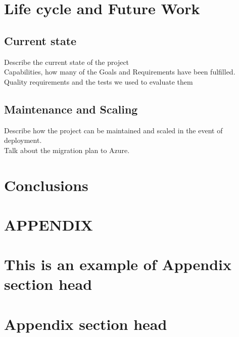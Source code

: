 \documentclass[prodmode,acmtosem]{acmsmall} %
\begin{document}
\section{Life cycle and Future Work}
\subsection{Current state}
Describe the current state of the project\\
Capabilities, how many of the Goals and Requirements have been fulfilled.\\
Quality requirements and the tests we used to evaluate them\\

\subsection{Maintenance and Scaling}
Describe how the project can be maintained and scaled in the event of deployment.\\
Talk about the migration plan to Azure.\\


\section{Conclusions}


\appendix
\section*{APPENDIX} \label{Appendix}
\setcounter{section}{1}


\begin{acks}
\end{acks}  





\elecappendix

\medskip

\section{This is an example of Appendix section head}


\section{Appendix section head}
\end{document}
